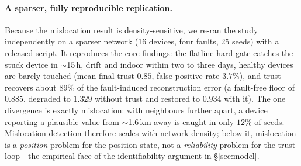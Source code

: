 \documentclass[10pt]{article}
\begin{document}
\paragraph{A sparser, fully reproducible replication.}
Because the mislocation result is density-sensitive, we re-ran the study
independently on a sparser network (16 devices, four faults, 25 seeds) with a
released script. It reproduces the core findings: the flatline hard gate catches
the stuck device in $\sim$15\,h, drift and indoor within two to three days, healthy
devices are barely touched (mean final trust $0.85$, false-positive rate $3.7\%$),
and trust recovers about $89\%$ of the fault-induced reconstruction error (a
fault-free floor of $0.885$, degraded to $1.329$ without trust and restored to
$0.934$ with it). The one divergence is exactly mislocation: with neighbours
further apart, a device reporting a plausible value from $\sim$1.6\,km away is
caught in only $12\%$ of seeds. Mislocation detection therefore scales with network
density; below it, mislocation is a \emph{position} problem for the position state,
not a \emph{reliability} problem for the trust loop---the empirical face of the
identifiability argument in \S\ref{sec:model}.
\end{document}
